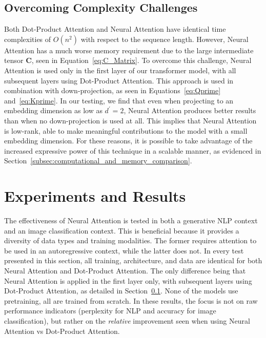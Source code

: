 \documentclass{article}
\begin{document}
\subsection{Overcoming Complexity Challenges}
\label{subsec:overcocming_complexity_challenges}
Both Dot-Product Attention and Neural Attention have identical time complexities of $O(n^{2})$ with respect to the sequence length. However, Neural Attention has a much worse memory requirement due to the large intermediate tensor $\mathbf{C}$, seen in Equation~\ref{eq:C_Matrix}. To overcome this challenge, Neural Attention is used only in the first layer of our transformer model, with all subsequent layers using Dot-Product Attention. This approach is used in combination with down-projection, as seen in Equations~\ref{eq:Qprime} and~\ref{eq:Kprime}. In our testing, we find that even when projecting to an embedding dimension as low as $d^{\prime}=2$, Neural Attention produces better results than when no down-projection is used at all. This implies that Neural Attention is low-rank, able to make meaningful contributions to the model with a small embedding dimension. For these reasons, it is possible to take advantage of the increased expressive power of this technique in a scalable manner, as evidenced in Section~\ref{subsec:computational_and_memory_comparison}.

\section{Experiments and Results}
\label{sec:experiments_and_results}

The effectiveness of Neural Attention is tested in both a generative NLP context and an image classification context. This is beneficial because it provides a diversity of data types and training modalities. The former requires attention to be used in an autoregressive context, while the latter does not. In every test presented in this section, all training, architecture, and data are identical for both Neural Attention and Dot-Product Attention. The only difference being that Neural Attention is applied in the first layer only, with subsequent layers using Dot-Product Attention, as detailed in Section~\ref{subsec:overcocming_complexity_challenges}. None of the models use pretraining, all are trained from scratch. In these results, the focus is not on raw performance indicators (perplexity for NLP and accuracy for image classification), but rather on the \textit{relative} improvement seen when using Neural Attention vs Dot-Product Attention. 
\end{document}
